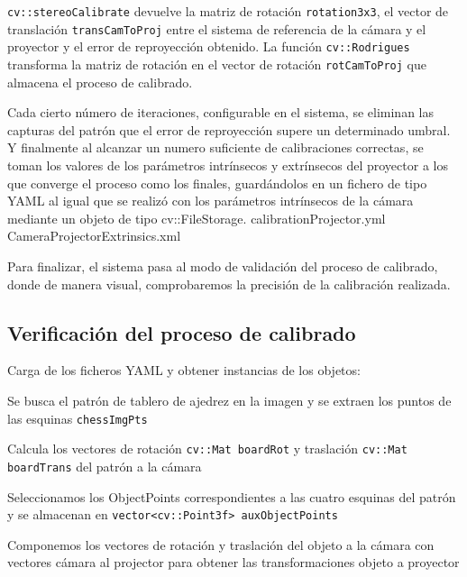 \texttt{cv::stereoCalibrate} devuelve la matriz de rotación \texttt{rotation3x3}, el vector de translación \texttt{transCamToProj} entre el sistema de referencia de la cámara y el proyector y el error de reproyección obtenido. La función \texttt{cv::Rodrigues} transforma la matriz de rotación en el vector de rotación \texttt{rotCamToProj} que almacena el proceso de calibrado.

Cada cierto número de iteraciones, configurable en el sistema, se eliminan las capturas del patrón que el error de reproyección supere un determinado umbral. Y finalmente al alcanzar un numero suficiente de calibraciones correctas, se toman los valores de los parámetros intrínsecos y extrínsecos del proyector a los que converge el proceso como los finales, guardándolos en un fichero de tipo YAML al igual que se realizó con los parámetros intrínsecos de la cámara mediante un objeto de tipo cv::FileStorage. calibrationProjector.yml CameraProjectorExtrinsics.xml

Para finalizar, el sistema pasa al modo de validación del proceso de calibrado, donde de manera visual, comprobaremos la precisión de la calibración realizada.

\subsection{Verificación del proceso de calibrado}
Carga de los ficheros YAML y obtener instancias de los objetos:

Se busca el patrón de tablero de ajedrez en la imagen y se extraen los puntos de las esquinas \texttt{chessImgPts}

Calcula los vectores de rotación \texttt{cv::Mat boardRot} y traslación \texttt{cv::Mat boardTrans} del patrón a la cámara

Seleccionamos los ObjectPoints correspondientes a las cuatro esquinas del patrón y se almacenan en \texttt{vector<cv::Point3f> auxObjectPoints}


Componemos los vectores de rotación y traslación del objeto a la cámara con vectores cámara al projector para obtener las transformaciones objeto a proyector

